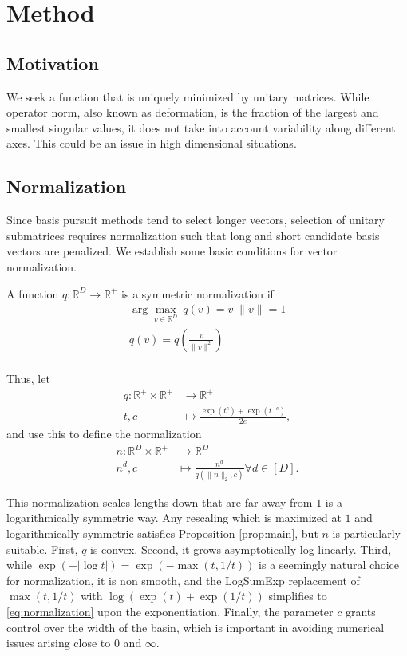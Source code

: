 \section{Method}


\subsection{Motivation}

We seek a function that is uniquely minimized by unitary matrices.
While operator norm, also known as deformation, is the fraction of the largest and smallest singular values, it does not take into account variability along different axes.
This could be an issue in high dimensional situations.

\subsection{Normalization}

Since basis pursuit methods tend to select longer vectors, selection of unitary submatrices requires normalization such that long and short candidate basis vectors are penalized.
We establish some basic conditions for vector normalization.
\begin{definition}
A function $q: \mathbb R^D \to \mathbb R^+ $ is a symmetric normalization if 
\begin{align}
\arg \max_{v \in \mathbb R^D} \ q (v) = v \; \|v\| = 1 \\
q(v) = q(\frac{v}{\|v\|^2}) \\
\end{align}
\label{cond:normalization}
\end{definition}

Thus, let
\begin{align}
\label{eq:normalization}
q: \mathbb R^+ \times \mathbb R^+  &\to \mathbb R^+ \\
t , c &\mapsto \frac{\exp(t^c) + \exp(t^{-c})}{2e},
\end{align}
and use this to define the normalization 
\begin{align}
n: \mathbb R^D \times \mathbb R^+ &\to \mathbb R^D \\
n^d , c &\mapsto \frac{n^d}{q(\|n\|_{2},c) } \forall d \in [D].
\end{align}

This normalization scales lengths down that are far away from $1$ is a logarithmically symmetric way.
Any rescaling which is maximized at $1$ and logarithmically symmetric satisfies Proposition \ref{prop:main}, but $n$ is particularly suitable.
First, $q$ is convex.
Second, it grows asymptotically log-linearly.
Third, while $\exp(-|\log t|) = \exp(-\max (t, 1/t))$ is a seemingly natural choice for normalization, it is non smooth, and the LogSumExp replacement of $\max (t, 1/t)$ with $ \log (\exp (t ) + \exp(1/t))$ simplifies to \ref{eq:normalization} upon the exponentiation.
Finally, the parameter $c$ grants control over the width of the basin, which is important in avoiding numerical issues arising close to $0$ and $\infty$.

